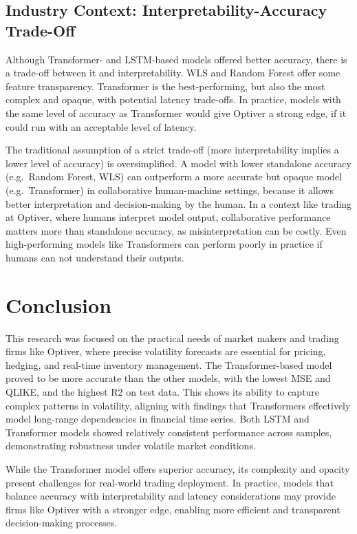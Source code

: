 \documentclass[
  letterpaper,
  DIV=11,
  numbers=noendperiod]{scrartcl}
\begin{document}
\subsection{Industry Context: Interpretability-Accuracy
Trade-Off}\label{industry-context-interpretability-accuracy-trade-off}

Although Transformer- and LSTM-based models offered better accuracy,
there is a trade-off between it and interpretability. WLS and Random
Forest offer some feature transparency. Transformer is the
best-performing, but also the most complex and opaque, with potential
latency trade-offs. In practice, models with the same level of accuracy
as Transformer would give Optiver a strong edge, if it could run with an
acceptable level of latency.

The traditional assumption of a strict trade-off (more interpretability
implies a lower level of accuracy) is oversimplified. A model with lower
standalone accuracy (e.g.~Random Forest, WLS) can outperform a more
accurate but opaque model (e.g.~Transformer) in collaborative
human-machine settings, because it allows better interpretation and
decision-making by the human. In a context like trading at Optiver,
where humans interpret model output, collaborative performance matters
more than standalone accuracy, as misinterpretation can be costly. Even
high-performing models like Transformers can perform poorly in practice
if humans can not understand their outputs.

\section{Conclusion}\label{conclusion}

This research was focused on the practical needs of market makers and
trading firms like Optiver, where precise volatility forecasts are
essential for pricing, hedging, and real-time inventory management. The
Transformer-based model proved to be more accurate than the other
models, with the lowest MSE and QLIKE, and the highest R2 on test data.
This shows its ability to capture complex patterns in volatility,
aligning with findings that Transformers effectively model long-range
dependencies in financial time series. Both LSTM and Transformer models
showed relatively consistent performance across samples, demonstrating
robustness under volatile market conditions.

While the Transformer model offers superior accuracy, its complexity and
opacity present challenges for real-world trading deployment. In
practice, models that balance accuracy with interpretability and latency
considerations may provide firms like Optiver with a stronger edge,
enabling more efficient and transparent decision-making processes.
\end{document}
